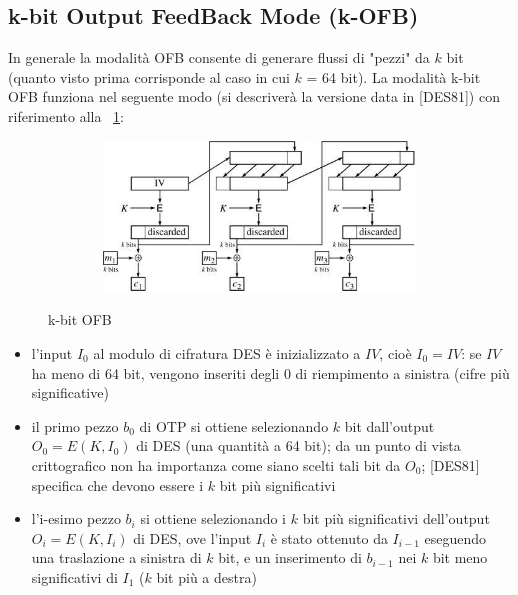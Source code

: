 \subsection{k-bit Output FeedBack Mode (k-OFB)}
In generale la modalità OFB consente di generare flussi di "pezzi" da $k$ bit (quanto visto prima corrisponde al caso in cui $k$ = 64 bit).
La modalità k-bit OFB funziona nel seguente modo (si descriverà la versione data in [DES81]) con riferimento alla \figurename ~\ref{fig:k-bit_OFB}:
\begin{figure}[htbp]
	\centering%
	\subfigure%
	{\includegraphics[height=4cm, width=12cm, keepaspectratio]{Immagini/Capitolo3/k-bit_OFB.png}}
	\caption{k-bit OFB \label{fig:k-bit_OFB}} 	
\end{figure}
\begin{itemize}
\item l'input $I_{0}$ al modulo di cifratura DES è inizializzato a $IV$, cioè $I_{0}=IV$: se $IV$ ha meno di 64 bit, vengono inseriti degli 0 di riempimento a sinistra (cifre più significative)
\item il primo pezzo $b_{0}$ di OTP si ottiene selezionando $k$ bit dall’output $O_{0} = E(K, I_{0})$ di DES (una quantità a 64 bit); da un punto di vista crittografico non ha importanza come siano scelti tali bit da $O_{0}$; [DES81] specifica che devono essere i $k$ bit più significativi
\item l’i-esimo pezzo $b_{i}$ si ottiene selezionando i $k$ bit più significativi dell'output $O_{i} = E(K, I_{i})$ di DES, ove l'input $I_{i}$ è stato ottenuto da $I_{i-1}$ eseguendo una traslazione a sinistra di $k$ bit, e un inserimento di $b_{i-1}$ nei $k$ bit meno significativi di $I_{1}$ ($k$ bit più a destra)
\end{itemize}
